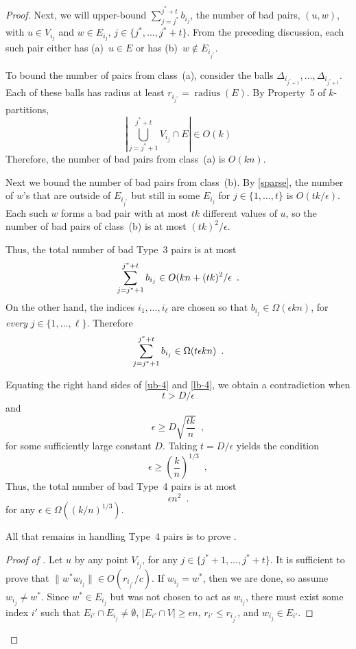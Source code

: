 \documentclass{patmorin}
\DeclareMathOperator{\radius}{radius}
\begin{document}
\begin{proof}
  Next, we will upper-bound $\sum_{j=j^*}^{j^*+t}b_{i_j}$, the number
  of bad pairs, $(u,w)$, with $u\in V_{i_j}$ and $w\in E_{i_j}$,
  $j\in\{j^*,\ldots,j^*+t\}$.  From the preceding discussion, each such
  pair either has (a)~$u\in E$ or has (b)~$w\not\in E_{i_{j^*}}$.

  To bound the number of pairs from class~(a), consider the balls
  $\Delta_{i_{j^*+1}},\ldots,\Delta_{i_{j^*+t}}$. Each of these balls
  has radius at least $r_{i_{j^*}}=\radius(E)$.  By Property~5 of
  $k$-partitions,
  \[
    \left|\bigcup_{j=j^*+1}^{j^*+t} V_{i_{j}}\cap E\right|
      \in O(k)
  \]
  Therefore, the number of bad pairs from class~(a) is $O(kn)$.

  Next we bound the number of bad pairs from class~(b).
  By \eqref{sparse}, the number of $w$'s that are outside of
  $E_{i_{j^*}}$ but still in some $E_{i_j}$ for $j\in\{1,\ldots,t\}$
  is $O(tk/\epsilon)$.  Each such $w$ forms a bad pair with at most
  $tk$ different values of $u$, so the number of bad pairs of class~(b)
  is at most $(tk)^2/\epsilon$.

  Thus, the total number of bad Type~3 pairs is at most
  \begin{equation}
    \sum_{j=j^*+1}^{j^*+t} b_{i_{j}}  \in O(kn + (tk)^2/\epsilon \enspace .
    \eqlabel{ub-4}
  \end{equation}
  On the other hand, the indices $i_1,\ldots,i_\ell$ are chosen
  so that $b_{i_j}\in\Omega(\epsilon kn)$, for \emph{every}
  $j\in\{1,\ldots,\ell\}$.  Therefore
  \begin{equation}
    \sum_{j=j^*+1}^{j^*+t} b_{i_{j}} 
        \in \Omega(t\epsilon kn) \enspace .
        \eqlabel{lb-4}
  \end{equation}
 
  Equating the right hand sides of \eqref{ub-4} and \eqref{lb-4}, we
  obtain a contradiction when 
  \[
      t > D/\epsilon
  \]
  and
  \[
          \epsilon\ge D\sqrt{\frac{tk}{n}} \enspace ,
  \]
  for some sufficiently large constant $D$.  Taking $t=D/\epsilon$ yields
  the condition
  \[
          \epsilon\ge \left(\frac{k}{n}\right)^{1/3} \enspace ,
  \]
  Thus, the total number of bad Type~4 pairs is at most
  \[
    \epsilon n^2 \enspace .
  \]
  for any $\epsilon \in \Omega((k/n)^{1/3})$. 

  All that remains in handling Type~4 pairs is to prove .

  \begin{proof}[Proof of ]
  Let $u$ by any point $V_{i_{j}}$, for any $j\in\{j^*+1,\ldots,j^*+t\}$.
  It is sufficient to prove that $\|w^*w_{i_{j}}\|\in O(r_{i_{j^*}}/c)$.
  If $w_{i_{j}}=w^*$, then we are done, so assume $w_{i_{j}}\neq
  w^*$.  Since $w^*\in E_{i_{j}}$ but was not chosen to act as
  $w_{i_{j}}$, there must exist some index $i'$ such that $E_{i'}\cap
  E_{i_{j}}\neq\emptyset$, $|E_{i'}\cap V|\ge\epsilon n$, $r_{i'}\le
  r_{i_{j^*}}$, and $w_{i_{j}}\in E_{i'}$.


\end{proof}
\end{proof}
\end{document}
